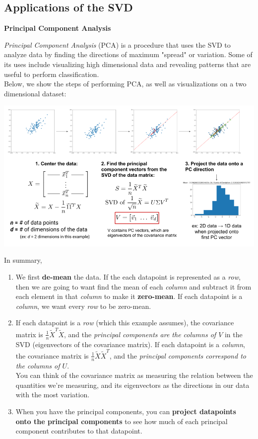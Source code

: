 \renewcommand{\arraystretch}{1.25}

\subsection*{Applications of the SVD}
\textbf{Principal Component Analysis}

\textit{Principal Component Analysis} (PCA) is a procedure that uses the SVD to analyze data by finding the directions of maximum "spread" or variation. Some of its uses include visualizing high dimensional data and revealing patterns that are useful to perform classification.\\
\newline
Below, we show the steps of performing PCA, as well as visualizations on a two dimensional dataset:

\includegraphics[width=\textwidth]{figures/pca-steps}

In summary,
\begin{enumerate}
    \item We first \textbf{de-mean} the data. If the each datapoint is represented as a \textit{row}, then we are going to want find the mean of each \textit{column} and subtract it from each element in that \textit{column} to make it \textbf{zero-mean}. If each datapoint is a \textit{column}, we want every \textit{row} to be zero-mean.
    \item If each datapoint is a \textit{row} (which this example assumes), the covariance matrix is $\frac{1}{n} \widetilde{X}^T\widetilde{X}$, and the \textit{principal components are the columns of $V$} in the SVD (eigenvectors of the covariance matrix). 
    If each datapoint is a \textit{column}, the covariance matrix is $\frac{1}{n} \widetilde{X}\widetilde{X}^T$, and the \textit{principal components correspond to the columns of $U$}. \\
    \newline
    You can think of the covariance matrix as measuring the relation between the quantities we're measuring, and its eigenvectors as the directions in our data with the most variation.
    \item When you have the principal components, you can \textbf{project datapoints onto the principal components} to see how much of each principal component contributes to that datapoint.
\end{enumerate}

